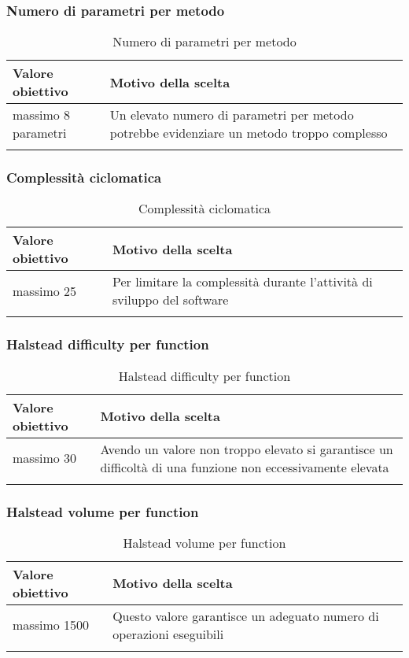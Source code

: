 \documentclass[../PianoDiQualifica.tex]{subfiles}
\begin{document}
		\subsubsection{Numero di parametri per metodo}
			\begin{longtable}[c] { >{\centering\arraybackslash}p{4cm} p{7cm} }
				\toprule
				\centerline{\textbf{Valore obiettivo}} & \centerline{\textbf{Motivo della scelta}} \\
				\midrule
					massimo 8 parametri & Un elevato numero di parametri per metodo potrebbe evidenziare un metodo troppo complesso \\
				\bottomrule
				\caption{Numero di parametri per metodo}
			\end{longtable}
			
		\subsubsection{Complessità ciclomatica}
			\begin{longtable}[c] { >{\centering\arraybackslash}p{4cm} p{7cm} }
				\toprule
				\centerline{\textbf{Valore obiettivo}} & \centerline{\textbf{Motivo della scelta}} \\
				\midrule
					massimo 25 & Per limitare la complessità durante l'attività di sviluppo del software \\
				\bottomrule
				\caption{Complessità ciclomatica}
			\end{longtable}
			
		\subsubsection{Halstead difficulty per function}
			\begin{longtable}[c] { >{\centering\arraybackslash}p{4cm} p{7cm} }
				\toprule
				\centerline{\textbf{Valore obiettivo}} & \centerline{\textbf{Motivo della scelta}} \\
				\midrule
					massimo 30 & Avendo un valore non troppo elevato si garantisce un difficoltà di una funzione non eccessivamente elevata  \\
				\bottomrule
				\caption{Halstead difficulty per function}
			\end{longtable}
			
		\subsubsection{Halstead volume per function}
			\begin{longtable}[c] { >{\centering\arraybackslash}p{4cm} p{7cm} }
				\toprule
				\centerline{\textbf{Valore obiettivo}} & \centerline{\textbf{Motivo della scelta}} \\
				\midrule
					massimo 1500 & Questo valore garantisce un adeguato numero di operazioni eseguibili \\
				\bottomrule
				\caption{Halstead volume per function}
			\end{longtable}
			
\end{document}

